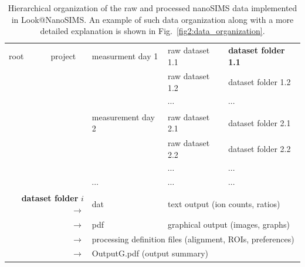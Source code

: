 \documentclass[a4paper, 11pt]{article}
\begin{document}
\begin{table}[ht]
\centering
\caption{\label{tab1:file_structure} Hierarchical organization of the raw and processed nanoSIMS data implemented in Look@NanoSIMS. An example of such data organization along with a more detailed explanation is shown in Fig.~\ref{fig2:data_organization}.}
\begin{tabular}{l@{ $\rightarrow$ }c@{ $\rightarrow$ }l@{ $\rightarrow$ }l@{ $\rightarrow$ }l}
\hline
root & project & measurment day 1 & raw dataset 1.1 & \textbf{dataset folder 1.1}\\
\multicolumn{2}{c}{} & & raw dataset 1.2  & dataset folder 1.2\\
\multicolumn{2}{c}{} & & $\cdots$ & $\cdots$ \\
\multicolumn{1}{c}{} & & measurement day 2 & raw dataset 2.1  & dataset folder 2.1\\
\multicolumn{2}{c}{} & & raw dataset 2.2  & dataset folder 2.2\\
\multicolumn{2}{c}{} & & $\cdots$ & $\cdots$\\
\multicolumn{1}{c}{} & & $\cdots$ & $\cdots$ & $\cdots$\\
\hline
\multicolumn{2}{r}{\textbf{dataset folder} $i$ $\rightarrow$} & dat & \multicolumn{2}{l}{text output (ion counts, ratios)} \\
\multicolumn{2}{r}{$\rightarrow$} & pdf & \multicolumn{2}{l}{graphical output (images, graphs)} \\
\multicolumn{2}{r}{$\rightarrow$} & \multicolumn{3}{l}{\hspace{-2mm}processing definition files (alignment, ROIs, preferences)} \\
\multicolumn{2}{r}{$\rightarrow$} & \multicolumn{3}{l}{\hspace{-2mm}OutputG.pdf (output summary)}\\
\hline
\end{tabular}
\end{table}
\end{document}
